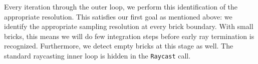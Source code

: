 Every iteration through the outer loop, we perform this identification
of the appropriate resolution.  This satisfies our first goal as
mentioned above: we identify the appropriate sampling resolution
at every brick boundary.  With small bricks, this means we will do
few integration steps before early ray termination is recognized.
Furthermore, we detect empty bricks at this stage as well.  The
standard
raycasting inner loop is hidden in the \texttt{Raycast} call.


% 
% 
% 
% 
 
